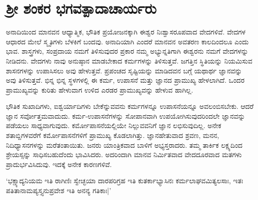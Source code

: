 \newpage

\section{ಶ್ರೀ ಶಂಕರ ಭಗವತ್ಪಾದಾಚಾರ್ಯರು}

ಅನಾದಿಯಿಂದ ಮಾನವನ ಆಧ್ಯಾತ್ಮಿಕ, ಭೌತಿಕ ಪ್ರಯೋಜನಕ್ಕಾಗಿ ಈಶ್ವರ ನಿಃಶ್ವಾಸರೂಪವಾದ ವೇದಗಳಿವೆ. ವೇದಗಳ ಆಧಾರದ ಮೇಲೆ ಸ್ಮೃತಿಗಳು ಬೆಳಕಿಗೆ ಬಂದವು. ಅನಾದಿಯಾಗಿ ಎಂದರೆ ಮಾನವನ ಅವತರಣ ಕಾಲದಿಂದಲೂ ಎಂದು ಭಾವ. ಶಾಸ್ತ್ರಗಳು, ಸಂಪ್ರದಾಯ ನಮಗೆ ತಿಳಿಸುವುದರ ಪ್ರಕಾರ ನಮ್ಮ ಅಭ್ಯುನ್ನತಿಗಾಗಿ ಈಶ್ವರನು ನಮಗೆ ವೇದಗಳನ್ನು ನೀಡಿದನು. ವೇದಗಳು ನಾವು ಅನುಷ್ಠಾನ ಮಾಡಬೇಕಾದ ಕರ್ಮಗಳನ್ನು ತಿಳಿಸುತ್ತವೆ. ಜಗತ್ತಿನ ಸ್ಥಿತಿಯನ್ನು ನಿಯಮಿಸುವ ಶಾಸನಗಳನ್ನು ಉಪಾಸಿಸಲು ಅವು ಹೇಳುತ್ತವೆ. ಪ್ರಪಂಚದ ಸೃಷ್ಟಿಯನ್ನು ಮಾಡಿದವನ ಬಗ್ಗೆ ಯಥಾರ್ಥ ಜ್ಞಾನವನ್ನು ಅವು ತಿಳಿಸುತ್ತವೆ. ಭಿನ್ನ ಭಿನ್ನ ಸ್ಥಳಗಳಲ್ಲಿ ಈ ಕರ್ಮ, ಉಪಾಸನೆ ಮತ್ತು ಜ್ಞಾನದ ಪ್ರಾಮುಖ್ಯ ಹೇಳಲಾಗಿದೆ. ಒಂದರ ಪ್ರಾಮುಖ್ಯವನ್ನು ಕುರಿತು ಹೇಳುವಾಗ ಉಳಿದ ಎರಡರ ಪ್ರಾಮುಖ್ಯವನ್ನು ಹೇಳುವ ಹಾಗಿಲ್ಲ.

ಭೌತಿಕ ಸುಖಾದಿಗಳು, ಐಶ್ವರ್ಯಾದಿಗಳು ಬೇಕೆನ್ನುವವನು ಕರ್ಮಗಳನ್ನೂ ಉಪಾಸನೆಯನ್ನೂ ಅವಲಂಬಿಸಬೇಕು. ಆದರೆ ಜ್ಞಾನ ಸರ್ವೋತ್ತಮವಾದುದು. ಕರ್ಮ-ಉಪಾಸನೆಗಳನ್ನು ಸೋಪಾನವಾಗಿ ಉಪಯೋಗಿಸುವುದರಿಂದಲೇ ಜ್ಞಾನವನ್ನು ಪಡೆಯಲು ಸಾಧ್ಯವಾಗುವುದು. ಕರ್ಮೋಪಾಸನೆಯಲ್ಲಿಯೇ ನಿಲ್ಲುವವನಿಗೆ ಜ್ಞಾನ ಲಭಿಸುವುದಿಲ್ಲ. ಅನೇಕ ಶತಾಬ್ದಿಗಳವರೆಗೆ ಕರ್ಮೋಪಾಸನೆಗಳಿಗೆ ಪ್ರಾಮುಖ್ಯ ಕೊಡಲಾಗಿತ್ತು. ಜ್ಞಾನಹೇತುವಾದ ಶ್ರವಣ, ಮನನ, ನಿದಿಧ್ಯಾಸನಗಳನ್ನು ಮರೆತಂತಾಯಿತು. ಜನರು ಯಾಂತ್ರಿಕವಾದ ಬಾಳಿಗೆ ಅಭ್ಯಸ್ತರಾದರು. ತಮ್ಮ ತಾರ್ಕಿಕ ಲಕ್ಷ್ಯದಿಂದ ಶ್ರೇಯಸ್ಸನ್ನು ಸಾಧಿಸಬಹುದೆಂದು ಭಾವಿಸಿದರು. ಅದರಿಂದಾಗಿ ಮಾನವ ನಿರ್ಮಿತವಾದ ವೇದದೂರವಾದ ಮತಗಳು ಪ್ರಾದುರ್ಭವಿಸಿದುವು. ಇದಕ್ಕೆ ಅನೇಕ ಕಾರಣಗಳಿವೆ.

`ಭಕ್ಷ್ಯಾದ್ಯನಿಯಮ ಇತಿ ರಾಗಿಣಿಃ ಸ್ವೇಚ್ಛಯಾ ದಾರಪರಿಗ್ರಹ ಇತಿ ಕುತರ್ಕಾಭ್ಯಾಸಿನಃ ಕರ್ಮಲಾಘವಮಿತ್ಯಲಸಾಃ, ಇತಃ ಪತಿತಾನಾಮಪ್ಯಸ್ತ್ಯನುಪ್ರವೇಶ ಇತಿ ಅನನ್ಯ ಗತಿಕಾಃ|'
